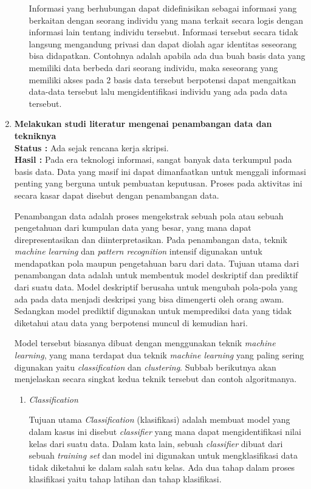 \documentclass[a4paper,twoside]{article}
\begin{document}
\begin{enumerate}
\begin{enumerate}
			Informasi yang berhubungan dapat didefinisikan sebagai informasi yang berkaitan dengan seorang individu yang mana terkait secara logis dengan informasi lain tentang individu tersebut. Informasi tersebut secara tidak langsung mengandung privasi dan dapat diolah agar identitas seseorang bisa didapatkan. Contohnya adalah apabila ada dua buah basis data yang memiliki data berbeda dari seorang individu, maka seseorang yang memiliki akses pada 2 basis data tersebut berpotensi dapat mengaitkan data-data tersebut lalu mengidentifikasi individu yang ada pada data tersebut.
		\end{enumerate}

		\item \textbf{Melakukan studi literatur mengenai penambangan data dan tekniknya}\\
		{\bf Status :} Ada sejak rencana kerja skripsi.\\
		{\bf Hasil :} Pada era teknologi informasi, sangat banyak data terkumpul pada basis data. Data yang masif ini dapat dimanfaatkan untuk menggali informasi penting yang berguna untuk pembuatan keputusan. Proses pada aktivitas ini secara kasar dapat disebut dengan penambangan data.

		Penambangan data adalah proses mengekstrak sebuah pola atau sebuah pengetahuan dari kumpulan data yang besar, yang mana dapat direpresentasikan dan diinterpretasikan. Pada penambangan data, teknik \textit{machine learning} dan \textit{pattern recognition} intensif digunakan untuk mendapatkan pola maupun pengetahuan baru dari data. Tujuan utama dari penambangan data adalah untuk membentuk model deskriptif dan prediktif dari suatu data. Model deskriptif berusaha untuk mengubah pola-pola yang ada pada data menjadi deskripsi yang bisa dimengerti oleh orang awam. Sedangkan model prediktif digunakan untuk memprediksi data yang tidak diketahui atau data yang berpotensi muncul di kemudian hari.
		
		Model tersebut biasanya dibuat dengan menggunakan teknik \textit{machine learning}, yang mana terdapat dua teknik \textit{machine learning} yang paling sering digunakan yaitu \textit{classification} dan \textit{clustering}. Subbab berikutnya akan menjelaskan secara singkat kedua teknik tersebut dan contoh algoritmanya.

		\begin{enumerate}
			\item \textit{Classification}
			
			Tujuan utama \textit{Classification} (klasifikasi) adalah membuat model yang dalam kasus ini disebut \textit{classifier} yang mana dapat mengidentifikasi nilai kelas dari suatu data. Dalam kata lain, sebuah \textit{classifier} dibuat dari sebuah \textit{training set} dan model ini digunakan untuk mengklasifikasi data tidak diketahui ke dalam salah satu kelas. Ada dua tahap dalam proses klasifikasi yaitu tahap latihan dan tahap klasifikasi.


\end{enumerate}
\end{enumerate}
\end{document}
